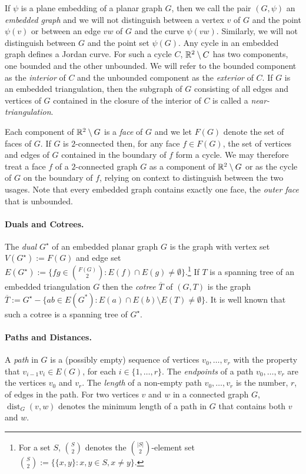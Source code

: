\documentclass{patmorin}
\DeclareMathOperator{\dist}{dist}
\begin{document}
If $\psi$ is a plane embedding of a planar graph $G$, then we call the pair $(G,\psi)$ an \emph{embedded graph} and we will not distinguish between a vertex $v$ of $G$ and the point $\psi(v)$ or between an edge $vw$ of $G$ and the curve $\psi(vw)$.  Similarly, we will not distinguish between $G$ and the  point set $\psi(G)$.  Any cycle in an embedded graph defines a Jordan curve. For such a cycle $C$, $\mathbb{R}^2\setminus C$ has two components, one bounded and the other unbounded. We will refer to the bounded component as the \emph{interior} of $C$ and the unbounded component as the \emph{exterior} of $C$.  If $G$ is an embedded triangulation, then the subgraph of $G$ consisting of all edges and vertices of $G$ contained in the closure of the interior of $C$ is called a \emph{near-triangulation}.

Each component of $\mathbb{R}^2\setminus G$ is a \emph{face} of $G$ and we let $F(G)$ denote the set of faces of $G$.  If $G$ is $2$-connected then, for any face $f\in F(G)$, the set of vertices and edges of $G$ contained in the boundary of $f$ form a cycle.  We may therefore treat a face $f$ of a $2$-connected graph $G$ as a component of $\mathbb{R}^2\setminus G$ or as the cycle of $G$ on the boundary of $f$, relying on context to distinguish between the two usages.  Note that every embedded graph contains exactly one face, the \emph{outer face} that is unbounded.

\paragraph{Duals and Cotrees.}

The \emph{dual} $G^\star$ of an embedded planar graph $G$ is the graph with vertex set $V(G^\star):=F(G)$ and edge set $E(G^{\star}):=\{fg\in \binom{F(G)}{2}:E(f)\cap E(g)\neq\emptyset\}$.\footnote{For a set $S$, $\binom{S}{2}$ denotes the $\binom{|S|}{2}$-element set $\binom{S}{2}:=\{\{x,y\}:x,y\in S, x\neq y\}$.}  If $T$ is a spanning tree of an embedded triangulation $G$ then the \emph{cotree} $\overline{T}$ of $(G,T)$ is the graph $\overline{T}:=G^\star-\{ab\in E(G^*):E(a)\cap E(b)\setminus E(T)\neq\emptyset\}$.  It is well known that such a cotree is a spanning tree of $G^\star$.

\paragraph{Paths and Distances.}

A \emph{path} in $G$ is a (possibly empty) sequence of vertices $v_0,\ldots,v_r$ with the property that $v_{i-1}v_i\in E(G)$, for each $i\in\{1,\ldots,r\}$.  The \emph{endpoints} of a path $v_0,\ldots,v_r$ are the vertices $v_0$ and $v_r$.
The \emph{length} of a non-empty path $v_0,\ldots,v_r$ is the number, $r$, of edges in the path.  For two vertices $v$ and $w$ in a connected graph $G$, $\dist_G(v,w)$ denotes the minimum length of a path in $G$ that contains both $v$ and $w$.
%
\end{document}
